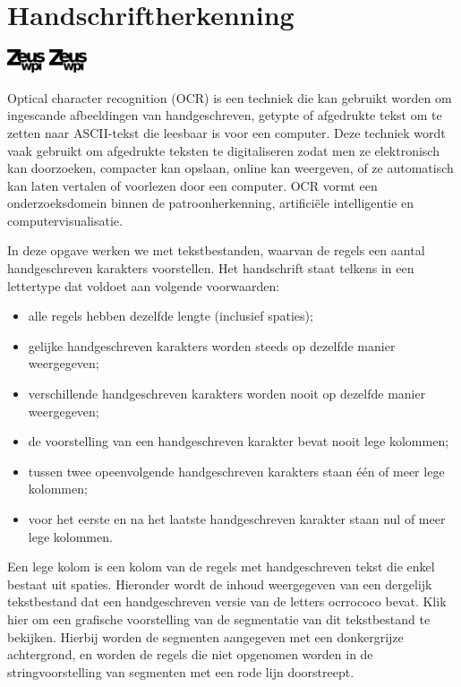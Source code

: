 \documentclass[a4paper]{article}
\begin{document}
\section*{Handschriftherkenning}
\flushright
\includegraphics[width=3em]{../logo-new.png}
\includegraphics[width=3em]{../logo-new.png}
\flushleft

Optical character recognition (OCR) is een techniek die kan gebruikt worden om
ingescande afbeeldingen van handgeschreven, getypte of afgedrukte tekst om te
zetten naar ASCII-tekst die leesbaar is voor een computer. Deze techniek wordt
vaak gebruikt om afgedrukte teksten te digitaliseren zodat men ze elektronisch
kan doorzoeken, compacter kan opslaan, online kan weergeven, of ze automatisch
kan laten vertalen of voorlezen door een computer. OCR vormt een
onderzoeksdomein binnen de patroonherkenning, artifici\"ele intelligentie en
computervisualisatie.

In deze opgave werken we met tekstbestanden, waarvan de regels een aantal
handgeschreven karakters voorstellen. Het handschrift staat telkens in een
lettertype dat voldoet aan volgende voorwaarden:

\begin{itemize}
    \item alle regels hebben dezelfde lengte (inclusief spaties);
    \item gelijke handgeschreven karakters worden steeds op dezelfde manier
        weergegeven;
    \item verschillende handgeschreven karakters worden nooit op dezelfde manier
        weergegeven;
    \item de voorstelling van een handgeschreven karakter bevat nooit lege
        kolommen;
    \item tussen twee opeenvolgende handgeschreven karakters staan \'e\'en of
        meer lege kolommen;
    \item voor het eerste en na het laatste handgeschreven karakter staan nul of
        meer lege kolommen.
\end{itemize}

Een lege kolom is een kolom van de regels met handgeschreven tekst die enkel
bestaat uit spaties. Hieronder wordt de inhoud weergegeven van een dergelijk
tekstbestand dat een handgeschreven versie van de letters ocrrococo bevat. Klik
hier om een grafische voorstelling van de segmentatie van dit tekstbestand te
bekijken. Hierbij worden de segmenten aangegeven met een donkergrijze
achtergrond, en worden de regels die niet opgenomen worden in de
stringvoorstelling van segmenten met een rode lijn doorstreept.
\end{document}

